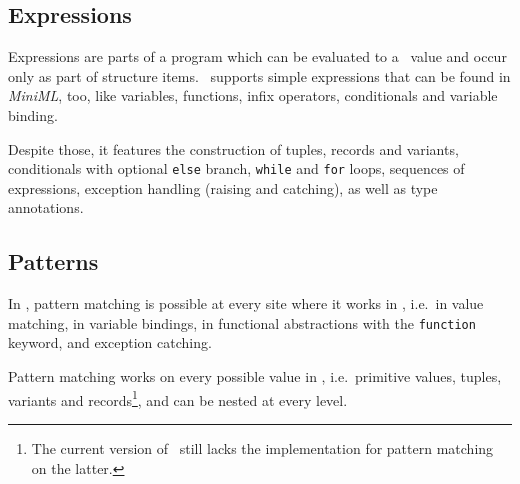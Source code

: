 \subsection*{Expressions}

Expressions are parts of a program which can be evaluated to a \ocaml\ value and
occur only as part of structure items.
\easyocaml\ supports simple expressions that can be found in \textsl{MiniML},
too, like variables, functions, infix operators, conditionals and variable
binding.

Despite those, it features the construction of tuples, records and variants,
conditionals with optional \texttt{else} branch, \texttt{while} and
\texttt{for} loops, sequences of expressions, exception handling (raising and
catching), as well as type annotations.

\subsection*{Patterns}

In \easyocaml, pattern matching is possible at every site where it works in
\ocaml, i.e.\ in value matching, in variable bindings, in
functional abstractions with the \texttt{function} keyword, and exception catching.

Pattern matching works on every possible value in \easyocaml, i.e.\ primitive
values, tuples, variants and records\footnote{The current version of \easyocaml\
still lacks the implementation for pattern matching on the latter.}, and can be
nested at every
level.

